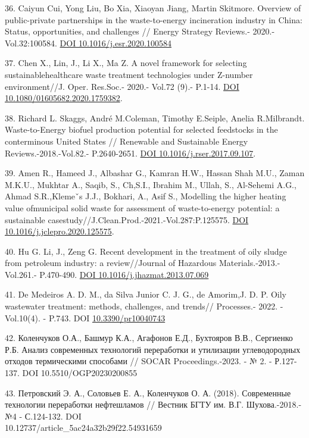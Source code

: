 \begin{references}
36. Caiyun Cui, Yong Liu, Bo Xia, Xiaoyan Jiang, Martin Skitmore.
Overview of public-private partnerships in the waste-to-energy
incineration industry in China: Status, opportunities, and challenges //
Energy Strategy Reviews.- 2020.- Vol.32:100584.
\href{https://doi.org/\%20DOI\%2010.1016/j.esr.2020.100584}{DOI
10.1016/j.esr.2020.100584}

37. Chen X., Lin, J., Li X., Ma Z. A novel framework for selecting
sustainablehealthcare waste treatment technologies under Z-number
environment//J. Oper. Res.Soc.- 2020.- Vol.72 (9).- P.1-14.
\href{https://doi.org/10.1080/01605682.2020.1759382}{DOI\\
10.1080/01605682.2020.1759382}.

38. Richard L. Skaggs, André M.Coleman, Timothy E.Seiple, Anelia
R.Milbrandt. Waste-to-Energy biofuel production potential for selected
feedstocks in the conterminous United States // Renewable and
Sustainable Energy Reviews.-2018.-Vol.82.- P.2640-2651.
\href{https://doi.org/10.1016/j.rser.2017.09.107}{DOI
10.1016/j.rser.2017.09.107}.

39. Amen R., Hameed J., Albashar G., Kamran H.W., Hassan Shah M.U.,
Zaman M.K.U., Mukhtar A., Saqib, S., Ch,S.I., Ibrahim M., Ullah, S.,
Al-Sehemi A.G., Ahmad S.R.,Klemeˇs J.J., Bokhari, A., Asif S., Modelling
the higher heating value ofmunicipal solid waste for assessment of
waste-to-energy potential: a sustainable
casestudy//J.Clean.Prod.-2021.-Vol.287:P.125575.
\href{https://doi.org/10.1016/j.jclepro.2020.125575}{DOI
10.1016/j.jclepro.2020.125575}.

40. Hu G. Li, J., Zeng G. Recent development in the treatment of oily
sludge from petroleum industry: a review//Journal of Hazardous
Materials.-2013.- Vol.261.- P.470-490.
\href{https://doi.org/10.1016/j.jhazmat.2013.07.069}{DOI
10.1016/j.jhazmat.2013.07.069}

41. De Medeiros A. D. M., da Silva Junior C. J. G., de Amorim,J. D. P.
Oily wastewater treatment: methods, challenges, and trends// Processes.-
2022. - Vol.10(4). - P.743. DOI
\href{http://dx.doi.org/10.3390/pr10040743}{10.3390/pr10040743}

42. Коленчуков О.А., Башмур К.А., Агафонов Е.Д., Бухтояров В.В.,
Сергиенко Р.Б. Анализ современных технологий переработки и утилизации
углеводородных отходов термическими способами // SOCAR
Proceedings.-2023. - № 2. - Р.127-137. DOI 10.5510/OGP20230200855

43. Петровский Э. А., Соловьев Е. А., Коленчуков О. А. (2018).
Современные технологии переработки нефтешла­мов // Вестник БГТУ им. В.Г.
Шухова.-2018.- №4 - С.124-132. DOI \\
10.12737/article\_5ac24a32b29f22.54931659


\end{references}
